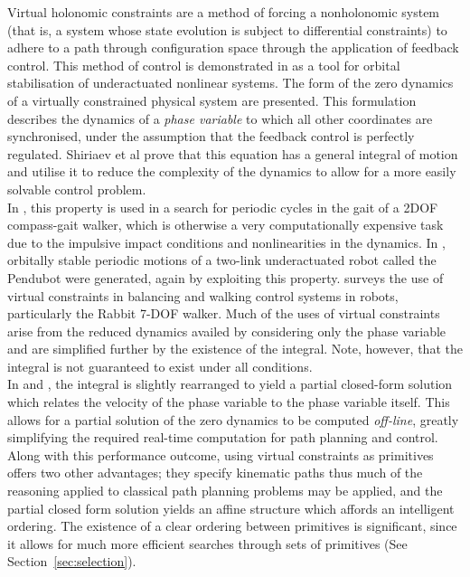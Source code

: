Virtual holonomic constraints are a method of forcing a nonholonomic system (that is, a system whose state evolution is subject to differential constraints) to adhere to a path through configuration space through the application of feedback control. This method of control is demonstrated in \cite{shiriaev2005constructive} as a tool for orbital stabilisation of underactuated nonlinear systems. The form of the zero dynamics of a virtually constrained physical system are presented. This formulation describes the dynamics of a \textit{phase variable} to which all other coordinates are synchronised, under the assumption that the feedback control is perfectly regulated. Shiriaev et al prove that this equation has a general integral of motion and utilise it to reduce the complexity of the dynamics to allow for a more easily solvable control problem. \\

In \cite{freidovich2009passive}, this property is used in a search for periodic cycles in the gait of a 2DOF compass-gait walker, which is otherwise a very computationally expensive task due to the impulsive impact conditions and nonlinearities in the dynamics. In \cite{freidovich2008periodic}, orbitally stable periodic motions of a two-link underactuated robot called the Pendubot were generated, again by exploiting this property. \cite{canudas2004concept} surveys the use of virtual constraints in balancing and walking control systems in robots, particularly the Rabbit 7-DOF walker. Much of the uses of virtual constraints arise from the reduced dynamics availed by considering only the phase variable and are simplified further by the existence of the integral. Note, however, that the integral is not guaranteed to exist under all conditions.\\

In \cite{manchester2011stable} and \cite{manchester13planning}, the integral is slightly rearranged to yield a partial closed-form solution which relates the velocity of the phase variable to the phase variable itself. This allows for a partial solution of the zero dynamics to be computed \textit{off-line}, greatly simplifying the required real-time computation for path planning and control. Along with this performance outcome, using virtual constraints as primitives offers two other advantages; they specify kinematic paths thus much of the reasoning applied to classical path planning problems may be applied, and the partial closed form solution yields an affine structure which affords an intelligent ordering. The existence of a clear ordering between primitives is significant, since it allows for much more efficient searches through sets of primitives (See Section~\ref{sec:selection}).

